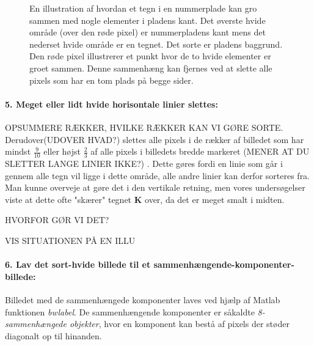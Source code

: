 
\begin{figure}[htp]
\centering
{} 
\caption{En illustration af hvordan et tegn i en nummerplade kan gro sammen med nogle elementer i pladens kant. Det øverste hvide område (over den røde pixel) er nummerpladens kant mens det nederset hvide område er en tegnet. Det sorte er pladens baggrund. Den røde pixel illustrerer et punkt hvor de to hvide elementer er groet sammen. Denne sammenhæng kan fjernes ved at slette alle pixels som har en tom plads på begge sider.}
\label{fig:tynd_linie}
\end{figure}

\paragraph{5. Meget eller lidt hvide horisontale linier slettes:}
OPSUMMERE RÆKKER, HVILKE RÆKKER KAN VI GØRE SORTE. Derudover(UDOVER HVAD?) slettes alle pixels i de rækker af billedet som har mindst $\frac{9}{10}$ eller højst $\frac{2}{3}$ af alle pixels i billedets bredde markeret (MENER AT DU SLETTER LANGE LINIER IKKE?) . Dette gøres fordi en linie som går i gennem alle tegn vil ligge i dette område, alle andre linier kan derfor sorteres fra. Man kunne overveje at gøre det i den vertikale retning, men vores undersøgelser viste at dette ofte "skærer" tegnet \textbf{K} over, da det er meget smalt i midten.

HVORFOR GØR VI DET?

VIS SITUATIONEN PÅ EN ILLU

\paragraph{6. Lav det sort-hvide billede til et sammenhængende-komponenter-billede:} Billedet med de sammenhængede komponenter laves ved hjælp af Matlab funktionen \textit{bwlabel}. De sammenhængende komponenter er såkaldte \textit{8-sammenhængede objekter}, hvor en komponent kan bestå af pixels der støder diagonalt op til hinanden.

